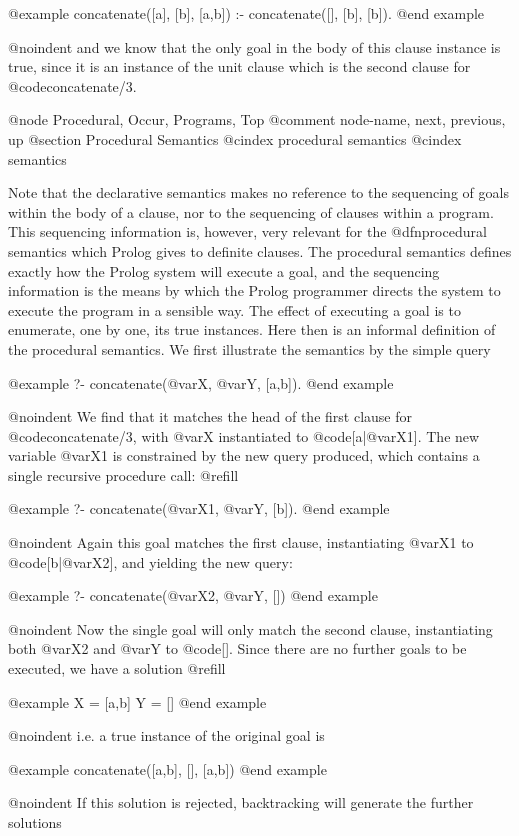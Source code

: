 {@example
concatenate([a], [b], [a,b]) :- concatenate([], [b], [b]).
@end example

@noindent
and we know that the only goal in the body of this clause instance is
true, since it is an instance of the unit clause which is the second
clause for @code{concatenate/3}.

@node Procedural, Occur, Programs, Top
@comment  node-name,  next,  previous,  up
@section Procedural Semantics
@cindex procedural semantics
@cindex semantics

Note that the declarative semantics makes no reference to the sequencing
of goals within the body of a clause, nor to the sequencing of clauses
within a program.  This sequencing information is, however, very
relevant for the @dfn{procedural semantics} which Prolog gives to
definite clauses.  The procedural semantics defines exactly how the
Prolog system will execute a goal, and the sequencing information is the
means by which the Prolog programmer directs the system to execute the
program in a sensible way.  The effect of executing a goal is to
enumerate, one by one, its true instances.  Here then is an informal
definition of the procedural semantics.  We first illustrate the
semantics by the simple query

@example
?- concatenate(@var{X}, @var{Y}, [a,b]).
@end example

@noindent
We find that it matches the head of the first clause for
@code{concatenate/3}, with @var{X} instantiated to @code{[a|@var{X1}]}.
The new variable @var{X1} is constrained by the new query produced,
which contains a single recursive procedure call: @refill

@example
?- concatenate(@var{X1}, @var{Y}, [b]).
@end example

@noindent
Again this goal matches the first clause, instantiating @var{X1} to
@code{[b|@var{X2}]}, and yielding the new query:

@example
?- concatenate(@var{X2}, @var{Y}, [])
@end example

@noindent
Now the single goal will only match the second clause, instantiating
both @var{X2} and @var{Y} to @code{[]}.  Since there are no further goals
to be executed, we have a solution @refill

@example
X = [a,b]
Y = []
@end example

@noindent
i.e. a true instance of the original goal is 

@example
concatenate([a,b], [], [a,b])
@end example

@noindent
If this solution is rejected, backtracking will generate the further
solutions

}
